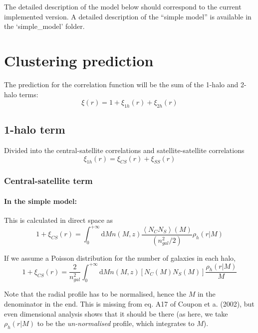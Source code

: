 \documentclass[10pt,a4paper]{article}
\begin{document}
The detailed description of the model below should correspond to the current implemented version. 
A detailed description of the ``simple model'' is available in the `simple\_model' folder.

\section{Clustering prediction}

The prediction for the correlation function will be the sum of the 1-halo and 2-halo terms:
\begin{equation}
\xi(r) = 1 + \xi_{1h}(r) + \xi_{2h}(r)
\end{equation}

\subsection{1-halo term}

Divided into the central-satellite correlations and satellite-satellite correlations
\begin{equation}
\xi_{1h}(r) = \xi_{CS}(r) + \xi_{SS}(r)
\end{equation}

\subsubsection{Central-satellite term}

\paragraph{In the simple model:}



This is calculated in direct space as
\begin{equation}
1 + \xi_{CS}(r) = \int_0^{+\infty} \mathrm{d}M n(M,z) \frac{\left\langle N_C N_S\right\rangle(M)}{(n_{gal}^2/2)}\rho_h(r|M)
\end{equation}

If we assume a Poisson distribution for the number of galaxies in each halo,
\begin{equation}
1 + \xi_{CS}(r) = \frac{2}{n_{gal}^2} \int_0^{+\infty} \mathrm{d}M n(M,z) \left[N_C(M) N_S(M)\right] \frac{\rho_h(r|M)}{M}
\end{equation}

Note that the radial profile has to be normalised, hence the $M$ in the denominator in the end. 
This is missing from eq. A17 of Coupon et a. (2002), but even dimensional analysis shows that it should be there (as here, we take $\rho_h(r|M)$ to be the \emph{un-normalised} profile, which integrates to $M$).
\end{document}
